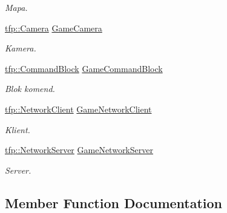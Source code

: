 \begin{DoxyCompactItemize}
\begin{DoxyCompactList}\small\item\em Mapa. \end{DoxyCompactList}\item 
\mbox{\label{classtfp_1_1_game_a73e9069bd2f851e7cfad4af9debfd848}} 
\mbox{\hyperlink{classtfp_1_1_camera}{tfp\+::\+Camera}} \mbox{\hyperlink{classtfp_1_1_game_a73e9069bd2f851e7cfad4af9debfd848}{Game\+Camera}}
\begin{DoxyCompactList}\small\item\em Kamera. \end{DoxyCompactList}\item 
\mbox{\label{classtfp_1_1_game_a5d8e9aff5037e0aba99f040920449e0b}} 
\mbox{\hyperlink{classtfp_1_1_command_block}{tfp\+::\+Command\+Block}} \mbox{\hyperlink{classtfp_1_1_game_a5d8e9aff5037e0aba99f040920449e0b}{Game\+Command\+Block}}
\begin{DoxyCompactList}\small\item\em Blok komend. \end{DoxyCompactList}\item 
\mbox{\label{classtfp_1_1_game_aa4fe17aa09e433f1ef9859dd489cb738}} 
\mbox{\hyperlink{classtfp_1_1_network_client}{tfp\+::\+Network\+Client}} \mbox{\hyperlink{classtfp_1_1_game_aa4fe17aa09e433f1ef9859dd489cb738}{Game\+Network\+Client}}
\begin{DoxyCompactList}\small\item\em Klient. \end{DoxyCompactList}\item 
\mbox{\label{classtfp_1_1_game_a698429c010b023c66047b8eab53fd189}} 
\mbox{\hyperlink{classtfp_1_1_network_server}{tfp\+::\+Network\+Server}} \mbox{\hyperlink{classtfp_1_1_game_a698429c010b023c66047b8eab53fd189}{Game\+Network\+Server}}
\begin{DoxyCompactList}\small\item\em Server. \end{DoxyCompactList}\end{DoxyCompactItemize}


\subsection{Member Function Documentation}
\mbox{\label{classtfp_1_1_game_a2ada50634779cf906814188793bc6fd3}} 
